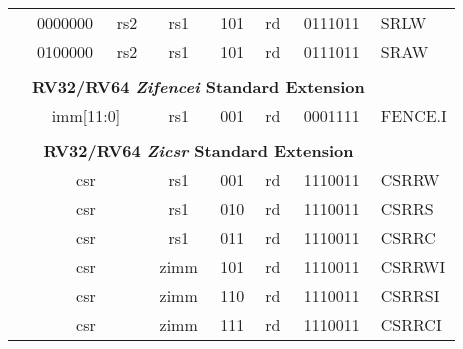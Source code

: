 \begin{table}[p]
\begin{small}
\begin{center}
\begin{tabular}{p{0in}p{0.4in}p{0.05in}p{0.05in}p{0.05in}p{0.05in}p{0.4in}p{0.6in}p{0.4in}p{0.6in}p{0.7in}l}
&
\multicolumn{4}{|c|}{0000000} &
\multicolumn{2}{c|}{rs2} &
\multicolumn{1}{c|}{rs1} &
\multicolumn{1}{c|}{101} &
\multicolumn{1}{c|}{rd} &
\multicolumn{1}{c|}{0111011} & SRLW \\
\cline{2-11}
  

&
\multicolumn{4}{|c|}{0100000} &
\multicolumn{2}{c|}{rs2} &
\multicolumn{1}{c|}{rs1} &
\multicolumn{1}{c|}{101} &
\multicolumn{1}{c|}{rd} &
\multicolumn{1}{c|}{0111011} & SRAW \\
\cline{2-11}
  

&
\multicolumn{10}{c}{} & \\
&
\multicolumn{10}{c}{\bf RV32/RV64 \emph{Zifencei} Standard Extension} & \\
\cline{2-11}
  

&
\multicolumn{6}{|c|}{imm[11:0]} &
\multicolumn{1}{c|}{rs1} &
\multicolumn{1}{c|}{001} &
\multicolumn{1}{c|}{rd} &
\multicolumn{1}{c|}{0001111} & FENCE.I \\
\cline{2-11}
  

&
\multicolumn{10}{c}{} & \\
&
\multicolumn{10}{c}{\bf RV32/RV64 \emph{Zicsr} Standard Extension} & \\
\cline{2-11}
  

&
\multicolumn{6}{|c|}{csr} &
\multicolumn{1}{c|}{rs1} &
\multicolumn{1}{c|}{001} &
\multicolumn{1}{c|}{rd} &
\multicolumn{1}{c|}{1110011} & CSRRW \\
\cline{2-11}
  

&
\multicolumn{6}{|c|}{csr} &
\multicolumn{1}{c|}{rs1} &
\multicolumn{1}{c|}{010} &
\multicolumn{1}{c|}{rd} &
\multicolumn{1}{c|}{1110011} & CSRRS \\
\cline{2-11}
  

&
\multicolumn{6}{|c|}{csr} &
\multicolumn{1}{c|}{rs1} &
\multicolumn{1}{c|}{011} &
\multicolumn{1}{c|}{rd} &
\multicolumn{1}{c|}{1110011} & CSRRC \\
\cline{2-11}
  

&
\multicolumn{6}{|c|}{csr} &
\multicolumn{1}{c|}{zimm} &
\multicolumn{1}{c|}{101} &
\multicolumn{1}{c|}{rd} &
\multicolumn{1}{c|}{1110011} & CSRRWI \\
\cline{2-11}
  

&
\multicolumn{6}{|c|}{csr} &
\multicolumn{1}{c|}{zimm} &
\multicolumn{1}{c|}{110} &
\multicolumn{1}{c|}{rd} &
\multicolumn{1}{c|}{1110011} & CSRRSI \\
\cline{2-11}
  

&
\multicolumn{6}{|c|}{csr} &
\multicolumn{1}{c|}{zimm} &
\multicolumn{1}{c|}{111} &
\multicolumn{1}{c|}{rd} &
\multicolumn{1}{c|}{1110011} & CSRRCI \\
\cline{2-11}
  


\end{tabular}
\end{center}
\end{small}
\end{table}
